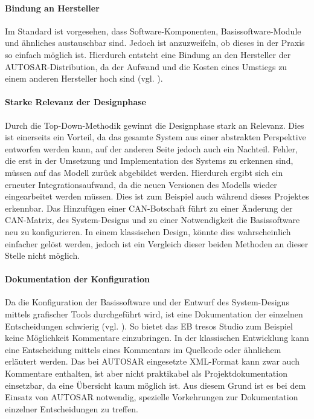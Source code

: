 \documentclass[
  a4paper,					    %
  twoside,
  DIV=calc,     				%
  bibliography=totoc,
  cleardoublepage=empty,
  ngerman,     					%
  final       					%
]{scrbook}
\begin{document}
\paragraph{Bindung an Hersteller}
Im Standard ist vorgesehen, dass Soft\-ware-Kom\-po\-nen\-ten, Basissoftware-Module und ähnliches austauschbar sind. Jedoch ist anzuzweifeln, ob dieses in der Praxis so einfach möglich ist. Hierdurch entsteht eine Bindung an den Hersteller der AUTOSAR-Distribution, da der Aufwand und die Kosten eines Umstiegs zu einem anderen Hersteller hoch sind (vgl. \cite{as_kritik}).

\paragraph{Starke Relevanz der Designphase}
Durch die Top-Down-Methodik gewinnt die Designphase stark an Relevanz. Dies ist einerseits ein Vorteil, da das gesamte System aus einer abstrakten Perspektive entworfen werden kann, auf der anderen Seite jedoch auch ein Nachteil. Fehler, die erst in der Umsetzung und Implementation des Systems zu erkennen sind, müssen auf das Modell zurück abgebildet werden. Hierdurch ergibt sich ein erneuter Integrationsaufwand, da die neuen Versionen des Modells wieder eingearbeitet werden müssen. Dies ist zum Beispiel auch während dieses Projektes erkennbar. Das Hinzufügen einer CAN-Botschaft führt zu einer Änderung der CAN-Matrix, des System-Designs und zu einer Notwendigkeit die Basissoftware neu zu konfigurieren. In einem klassischen Design, könnte dies wahrscheinlich einfacher gelöst werden, jedoch ist ein Vergleich dieser beiden Methoden an dieser Stelle nicht möglich.

\paragraph{Dokumentation der Konfiguration}
Da die Konfiguration der Basissoftware und der Entwurf des System-Designs mittels grafischer Tools durchgeführt wird, ist eine Dokumentation der einzelnen Entscheidungen schwierig (vgl. \cite[Seite 182 f.]{SE_Autosar}). So bietet das EB tresos Studio zum Beispiel keine Möglichkeit Kommentare einzubringen. In der klassischen Entwicklung kann eine Entscheidung mittels eines Kommentars im Quellcode oder ähnlichem erläutert werden. Das bei AUTOSAR eingesetzte XML-Format kann zwar auch Kommentare enthalten, ist aber nicht praktikabel als Projektdokumentation einsetzbar, da eine Übersicht kaum möglich ist. Aus diesem Grund ist es bei dem Einsatz von AUTOSAR notwendig, spezielle Vorkehrungen zur Dokumentation einzelner Entscheidungen zu treffen.
\end{document}
